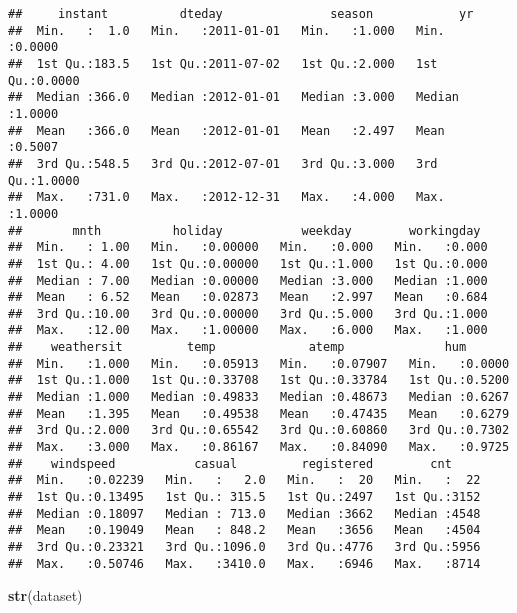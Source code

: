 \documentclass[]{article}
\newenvironment{Shaded}{\begin{snugshade}}{\end{snugshade}}
\newcommand{\KeywordTok}[1]{\textcolor[rgb]{0.13,0.29,0.53}{\textbf{#1}}}
\newcommand{\NormalTok}[1]{#1}
\begin{document}
\begin{verbatim}
##     instant          dteday               season            yr        
##  Min.   :  1.0   Min.   :2011-01-01   Min.   :1.000   Min.   :0.0000  
##  1st Qu.:183.5   1st Qu.:2011-07-02   1st Qu.:2.000   1st Qu.:0.0000  
##  Median :366.0   Median :2012-01-01   Median :3.000   Median :1.0000  
##  Mean   :366.0   Mean   :2012-01-01   Mean   :2.497   Mean   :0.5007  
##  3rd Qu.:548.5   3rd Qu.:2012-07-01   3rd Qu.:3.000   3rd Qu.:1.0000  
##  Max.   :731.0   Max.   :2012-12-31   Max.   :4.000   Max.   :1.0000  
##       mnth          holiday           weekday        workingday   
##  Min.   : 1.00   Min.   :0.00000   Min.   :0.000   Min.   :0.000  
##  1st Qu.: 4.00   1st Qu.:0.00000   1st Qu.:1.000   1st Qu.:0.000  
##  Median : 7.00   Median :0.00000   Median :3.000   Median :1.000  
##  Mean   : 6.52   Mean   :0.02873   Mean   :2.997   Mean   :0.684  
##  3rd Qu.:10.00   3rd Qu.:0.00000   3rd Qu.:5.000   3rd Qu.:1.000  
##  Max.   :12.00   Max.   :1.00000   Max.   :6.000   Max.   :1.000  
##    weathersit         temp             atemp              hum        
##  Min.   :1.000   Min.   :0.05913   Min.   :0.07907   Min.   :0.0000  
##  1st Qu.:1.000   1st Qu.:0.33708   1st Qu.:0.33784   1st Qu.:0.5200  
##  Median :1.000   Median :0.49833   Median :0.48673   Median :0.6267  
##  Mean   :1.395   Mean   :0.49538   Mean   :0.47435   Mean   :0.6279  
##  3rd Qu.:2.000   3rd Qu.:0.65542   3rd Qu.:0.60860   3rd Qu.:0.7302  
##  Max.   :3.000   Max.   :0.86167   Max.   :0.84090   Max.   :0.9725  
##    windspeed           casual         registered        cnt      
##  Min.   :0.02239   Min.   :   2.0   Min.   :  20   Min.   :  22  
##  1st Qu.:0.13495   1st Qu.: 315.5   1st Qu.:2497   1st Qu.:3152  
##  Median :0.18097   Median : 713.0   Median :3662   Median :4548  
##  Mean   :0.19049   Mean   : 848.2   Mean   :3656   Mean   :4504  
##  3rd Qu.:0.23321   3rd Qu.:1096.0   3rd Qu.:4776   3rd Qu.:5956  
##  Max.   :0.50746   Max.   :3410.0   Max.   :6946   Max.   :8714
\end{verbatim}

\begin{Shaded}
\begin{Highlighting}[]
\KeywordTok{str}\NormalTok{(dataset)}
\end{Highlighting}
\end{Shaded}
\end{document}
